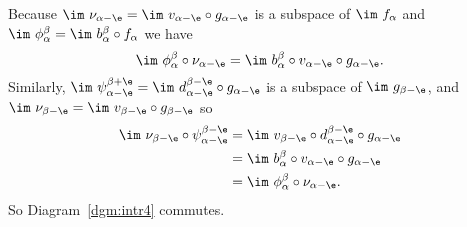 \begin{enumerate}[label=\Roman*.]
  Because $\im~\nu_{\alpha-\e} = \im~v_{\alpha-\e}\circ g_{\alpha-\e}$ is a subspace of $\im~f_\alpha$ and $\im~\phi_\alpha^\beta = \im~b_\alpha^\beta\circ f_\alpha$ we have
  \[ \im~\phi_\alpha^\beta\circ \nu_{\alpha-\e} = \im~b_\alpha^\beta\circ v_{\alpha-\e}\circ g_{\alpha-\e}.\]
  Similarly, $\im~\psi_{\alpha-\e}^{\beta + \e} = \im~d_{\alpha-\e}^{\beta -\e}\circ g_{\alpha-\e}$ is a subspace of $\im~g_{\beta-\e}$, and $\im~\nu_{\beta -\e} = \im~v_{\beta -\e}\circ g_{\beta-\e}$ so
  \begin{align*}
    \im~\nu_{\beta -\e}\circ\psi_{\alpha-\e}^{\beta -\e} &= \im~v_{\beta -\e}\circ d_{\alpha-\e}^{\beta-\e}\circ g_{\alpha-\e}\\
      &=\im~ b_\alpha^\beta\circ v_{\alpha-\e}\circ g_{\alpha-\e}\\
      &= \im~\phi_\alpha^\beta\circ\nu_{\alpha-\e}.
  \end{align*}
  So Diagram~\ref{dgm:intr4} commutes.
\end{enumerate}
